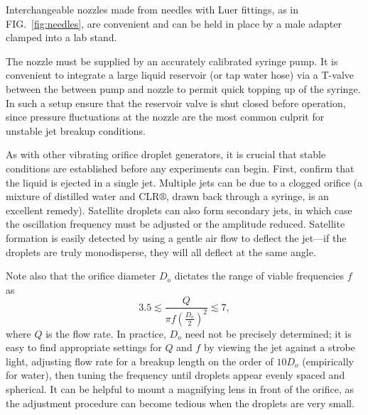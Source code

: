 \documentclass[aip,rsi,reprint,graphicx]{revtex4-1} %
\begin{document}
Interchangeable nozzles made from needles with Luer fittings, as in FIG.~\ref{fig:needles}, are
convenient and can be held in place by a male adapter clamped into a lab stand.


The nozzle must be supplied by an accurately calibrated syringe pump. It is
convenient to integrate a large liquid reservoir (or tap water hose) via a
T-valve between the between pump and nozzle to permit quick topping up of the
syringe. In such a setup ensure that the reservoir valve is shut closed before operation,
since pressure fluctuations at the nozzle are the most common culprit for
unstable jet breakup conditions.

As with other vibrating orifice droplet generators, it is crucial that stable
conditions are established before any experiments can begin. First, confirm that
the liquid is ejected in a single jet. Multiple jets can be due to a clogged
orifice (a mixture of distilled water and CLR$\circledR$, drawn back through a
syringe, is an excellent remedy). Satellite droplets can also form secondary
jets, in which case the oscillation frequency must be adjusted or the amplitude
reduced. Satellite formation is easily detected by using a gentle air flow to
deflect the jet---if the droplets are truly monodisperse, they will all deflect
at the same angle.\cite{Strom69}


Note also that the orifice diameter $D_o$ dictates the range of viable
frequencies $f$ as 
\begin{equation}
    3.5 \lesssim \frac{Q}{\pi f \left(\frac{D_o}{2}\right)^2}
\lesssim 7,
\end{equation}
where $Q$ is the flow rate.\cite{Savart33, Rayleigh79} In
practice, $D_o$ need not be
precisely determined; it is easy to find appropriate settings for $Q$
and $f$ by viewing the jet against a strobe light, adjusting flow rate for a breakup
length on the order of $10 D_o$ (empirically for water), then tuning the frequency
until droplets appear evenly spaced and spherical. It can be helpful to mount a
magnifying lens in front of the orifice, as the adjustment procedure can become
tedious when the droplets are very small.
\end{document}
